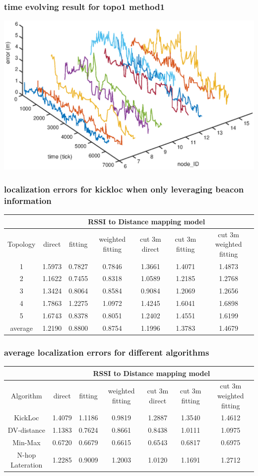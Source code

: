 \documentclass[11pt]{beamer}
\begin{document}
\begin{frame}
 \frametitle{time evolving result for topo1 method1}
\includegraphics[width=\textwidth]{time_evolving_topo1_method1.eps} 
\end{frame}

\begin{frame}
\frametitle{localization errors for kickloc when only leveraging beacon information}
\tiny
\begin{tabular}{|c|c|c|c|c|c|c|}
\hline 
 & \multicolumn{6}{c|}{RSSI to Distance mapping model} \\ 
\hline 
Topology & direct  & fitting & weighted fitting & cut 3m direct & cut 3m fitting & cut 3m weighted fitting \\ 
\hline 
1 & 1.5973 & 0.7827 & 0.7846 & 1.3661 & 1.4071 & 1.4873 \\
\hline 
2 & 1.1622 & 0.7455 & 0.8318 & 1.0589 & 1.2185 & 1.2768 \\
\hline 
3 & 1.3424 & 0.8064 & 0.8584 & 0.9084 & 1.2069 & 1.2656 \\
\hline 
4 & 1.7863 & 1.2275 & 1.0972 & 1.4245 & 1.6041 & 1.6898 \\
\hline 
5 & 1.6743 & 0.8378 & 0.8051 & 1.2402 & 1.4551 & 1.6199 \\
\hline 
average & 1.2190 & 0.8800 & 0.8754 & 1.1996 & 1.3783 & 1.4679 \\
\hline 
\end{tabular} 
\end{frame}

\begin{frame}
\frametitle{average localization errors for different algorithms }
\tiny
\begin{tabular}{|c|c|c|c|c|c|c|}
\hline 
 & \multicolumn{6}{c|}{RSSI to Distance mapping model} \\ 
\hline 
Algorithm & direct  & fitting & weighted fitting & cut 3m direct & cut 3m fitting & cut 3m weighted fitting \\ 
\hline 
KickLoc & 1.4079 & 1.1186 & 0.9819 & 1.2887 & 1.3540 & 1.4612 \\
\hline 
DV-distance & 1.1383 & 0.7624 & 0.8661 & 0.8438 & 1.0111 & 1.0975 \\
\hline
Min-Max & 0.6720 & 0.6679 & 0.6615 & 0.6543 & 0.6817 & 0.6975 \\
\hline
N-hop Lateration & 1.2285 & 0.9009 & 1.2003 & 1.0120 & 1.1691 & 1.2712 \\
\hline
\end{tabular} 
\end{frame}
\end{document}
